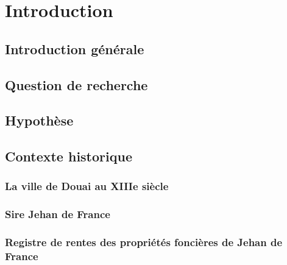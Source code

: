 \chapter{Introduction}
\section{Introduction générale}
\section{Question de recherche}
\section{Hypothèse}
\section{Contexte historique}
\subsection{La ville de Douai au XIIIe siècle}
%
\subsection{Sire Jehan de France}
\subsection{Registre de rentes des propriétés foncières de Jehan de France}

